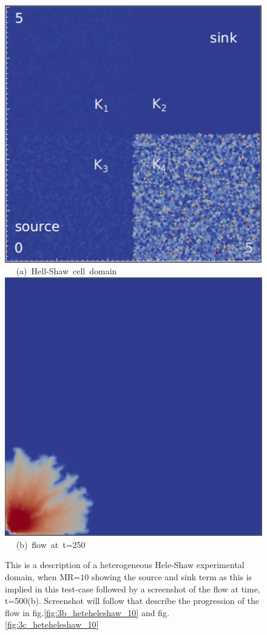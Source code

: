 \begin{figure}[ht] 
\vbox{
\hbox{\hspace{3.5cm}
\includegraphics[width=.5\textwidth]{./Pics1/Saffman_heterogeneous/saffman_heter_fixed_1.pdf} 
}
\vspace{0.0cm}
\hbox{\hspace{5.0cm} (a) Hell-Shaw cell domain   
}
\vspace{0.25cm}
\hbox{\hspace{3.5cm}
\includegraphics[width=.5\textwidth]{./Pics1/Saffman_heterogeneous/saffman_heter_fixed_500.pdf}
}
\vspace{0.0cm}
\hbox{\hspace{5.0cm} (b) flow at t=250     
}
}     
\caption{This is a description of a heterogeneous Hele-Shaw experimental domain, when MR=$10$ showing the source and sink term as this is implied in this test-case followed by a screenshot of the flow at time, t=500(b). Screenshot will follow that describe the progression of the flow in fig.\ref{fig:3b_heteheleshaw_10} and fig.\ref{fig:3c_heteheleshaw_10}}
\label{fig:3a_heteheleshaw_10}
\end{figure}



